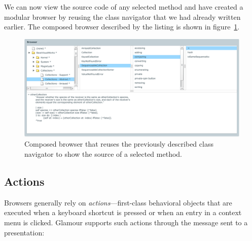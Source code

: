\documentclass[a4paper,10pt,twoside]{book}
\begin{document}
We can now view the source code of any selected method and have created a modular browser by reusing the class navigator that we had already written earlier. The composed browser described by the listing is shown in figure~\ref{fig:composed-browser}.

\begin{figure}[htbp]
\centerline{\includegraphics[width=\linewidth]{classbrowser.pdf}}
\caption{Composed browser that reuses the previously described class navigator to show the source of a selected method.}
\label{fig:composed-browser}
\end{figure}


\subsection{Actions}
\label{sec:tutorial/actions}

Browsers generally rely on \emph{actions}---first-class behavioral objects that are executed when a keyboard shortcut is pressed or when an entry in a context menu is clicked. Glamour supports such actions through the  message sent to a presentation:

\end{document}
